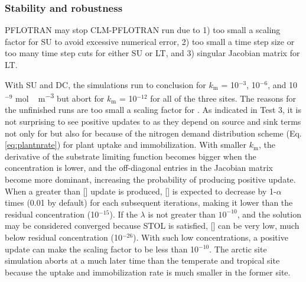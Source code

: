 \documentclass[gmd, manuscript]{copernicus}
\begin{document}
\subsubsection{Stability and robustness}
PFLOTRAN may stop CLM-PFLOTRAN run due to  1) too small a scaling factor for SU
to avoid excessive numerical error, 2) too small a time step size or too many
time step cuts for either SU or LT, and 3) singular Jacobian matrix for LT. 

With SU and DC, the simulations run to conclusion for $k_\text{m}$ = 10$^{-3}$,
10$^{-6}$, and 10$^{-9}$ \unit{mol\,m^{-3}} but abort for $k_\text{m}$ =
10$^{-12}$ for all of the three sites. The reasons
for the unfinished runs are too small a scaling factor for .
As indicated in Test 3, it is not surprising
to see positive updates to  as they depend on source and
sink terms not only for  but also for  because of the
nitrogen demand distribution scheme (Eq. \ref{eq:plantnrate}) for plant uptake
and immobilization. With smaller $k_\text{m}$, the derivative of the substrate
limiting function becomes bigger when
the concentration is lower, and the off-diagonal entries in the Jacobian matrix
become more dominant, increasing the probability of producing positive update.
When a greater than [] update is produced, [] is
expected to decrease by 1-$\alpha$ times (0.01 by default) for each subsequent
iterations, making it lower than the residual concentration (10$^{-15}$). If
the $\lambda$ is not greater than $10^{-10}$, and the solution may be
considered converged because STOL is satisfied, [] can be very low,
much below residual concentration (10$^{-26}$).
With such low concentrations, a positive update can  make the scaling factor to
be less than 10$^{-10}$. The arctic site simulation aborts at a much later time than the
temperate and tropical site because the uptake and immobilization rate is much smaller
 in the former site.
\end{document}
